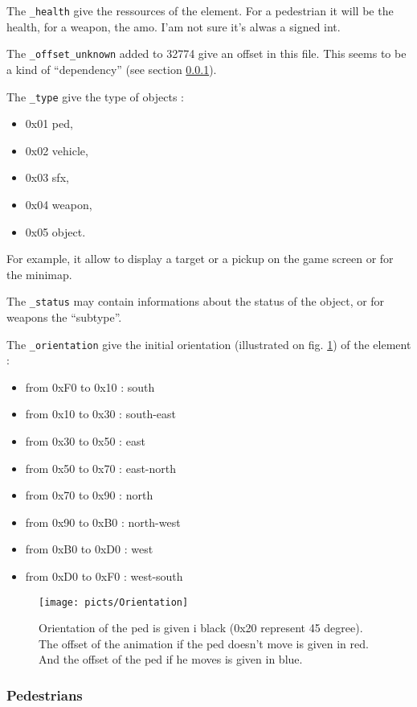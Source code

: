 \documentclass[a4paper,twoside,12pt,dvips]{article}
\begin{document}
The \texttt{\_health} give the ressources of the element. For a pedestrian it will be the health, for a weapon, the amo. I'am not sure it's alwas a signed int.

The \texttt{\_offset\_unknown} added to 32774 give an offset in this file. This seems to be a kind of ``dependency'' (see section \ref{sec:pedestrians}).

The \texttt{\_type} give the type of objects : 
\begin{itemize}
\item 0x01 ped,
\item 0x02 vehicle,
\item 0x03 sfx,
\item 0x04 weapon,
\item 0x05 object.
\end{itemize}
For example, it allow to display a target or a pickup on the game screen or for the minimap.

The \texttt{\_status} may contain informations about the status of the object, or for weapons the ``subtype''.

The \texttt{\_orientation} give the initial orientation (illustrated on fig. \ref{fig:orientation}) of the element :
\begin{itemize}
\item from 0xF0 to 0x10 : south
\item from 0x10 to 0x30 : south-east
\item from 0x30 to 0x50 : east
\item from 0x50 to 0x70 : east-north
\item from 0x70 to 0x90 : north
\item from 0x90 to 0xB0 : north-west
\item from 0xB0 to 0xD0 : west
\item from 0xD0 to 0xF0 : west-south
\end{itemize}
\begin{figure}[htbp]
  \texttt{[image: picts/Orientation]}\centering 
  \caption{Orientation of the ped is given i black (0x20 represent 45 degree). The offset of the animation if the ped doesn't move is given in red. And the offset of the ped if he moves is given in blue.}
  \label{fig:orientation}
\end{figure}

\subsubsection{Pedestrians}
\label{sec:pedestrians}
\end{document}
